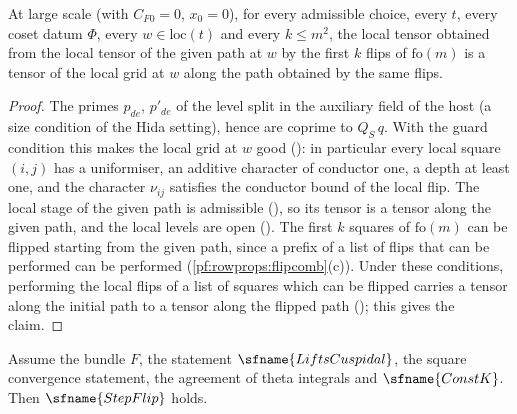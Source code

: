 \begin{lemma}\label{pf:rowprops:localtensor}
At large scale (with $C_{F0}=0$, $x_0=0$), for every admissible choice, every $t$, every coset datum $\Phi$, every
$w\in\mathrm{loc}(t)$ and every $k\le m^2$, the local tensor obtained from the local tensor of the given path at $w$ by the
first $k$ flips of $\mathrm{fo}(m)$ is a tensor of the local grid at $w$ along the path obtained by the same flips.
\end{lemma}

\begin{proof}
The primes $p_{de}$, $p'_{de}$ of the level split in the auxiliary field of the host (a size condition of the Hida
setting), hence are coprime to $Q_S\,q$. With the guard condition this makes the local grid at $w$ good
(): in particular every local square $(i,j)$ has a uniformiser, an
additive character of conductor one, a depth at least one, and the character $\nu_{ij}$ satisfies the conductor bound of
the local flip. The local stage of the given path is admissible (),
so its tensor is a tensor along the given path, and the local levels are open
(). The first $k$ squares of $\mathrm{fo}(m)$ can be flipped starting
from the given path, since a prefix of a list of flips that can be performed can be performed
(\cref{pf:rowprops:flipcomb}(c)). Under these conditions, performing the local flips of a list of squares which can be
flipped carries a tensor along the initial path to a tensor along the flipped path
(); this gives the claim.
\end{proof}

\begin{proposition}[Flip]\label{pf:rowprops:flipmain}
Assume the bundle $F$, the statement $\sfname{LiftsCuspidal}$, the square convergence statement, the agreement of theta
integrals and $\sfname{ConstK}$. Then $\sfname{StepFlip}$ holds.
\end{proposition}

